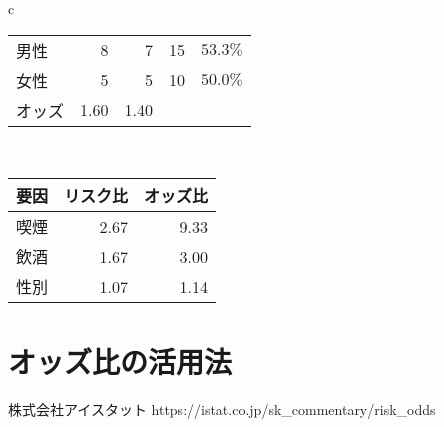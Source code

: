 \documentclass{ltjsarticle}
\begin{document}
\begin{table}[b]
\begin{tabular}{c}
\begin{minipage}{0.4\hsize}
\begin{tabular}{l|r|r|r|r}
                男性 & 8 & 7 & 15 & $53.3\%$ \\
                女性 & 5 & 5 & 10 & $50.0\%$ \\ \hline 
                オッズ & 1.60 & 1.40 & \multicolumn{2}{|l}{} \\ \hline
            \end{tabular}
        \end{minipage} \\
        \begin{minipage}{0.4\hsize}
            \centering
            \begin{tabular}{l|r|r} \hline 
                要因& \multicolumn{1}{|l|}{リスク比} & \multicolumn{1}{l}{オッズ比} \\\hline \hline
                喫煙& 2.67 & 9.33  \\
                飲酒& 1.67 & 3.00 \\
                性別& 1.07 & 1.14 \\ \hline 
            \end{tabular}
        \end{minipage}

    \end{tabular}
\end{table}

\section{オッズ比の活用法}


\begin{thebibliography}{1}
     株式会社アイスタット https://istat.co.jp/sk\_commentary/risk\_odds
\end{thebibliography}
\end{document}
